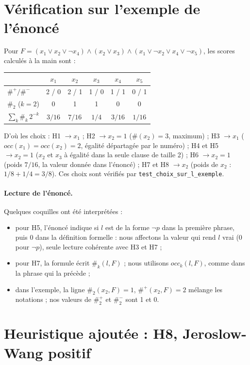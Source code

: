 \documentclass[11pt,a4paper]{article}
\begin{document}
\section{Vérification sur l'exemple de l'énoncé}

Pour $F = (x_1 \lor x_2 \lor \lnot x_4) \land (x_2 \lor x_3) \land
(x_1 \lor \lnot x_2 \lor x_4 \lor \lnot x_5)$, les scores calculés à la main
sont :
\begin{center}
\begin{tabular}{lccccc}
  \toprule
  & $x_1$ & $x_2$ & $x_3$ & $x_4$ & $x_5$ \\
  \midrule
  $\#^+ / \#^-$ & 2 / 0 & 2 / 1 & 1 / 0 & 1 / 1 & 0 / 1 \\
  $\#_2$ ($k = 2$) & 0 & 1 & 1 & 0 & 0 \\
  $\sum_k \#_k\,2^{-k}$ & $3/16$ & $7/16$ & $1/4$ & $3/16$ & $1/16$ \\
  \bottomrule
\end{tabular}
\end{center}
D'où les choix : H1 $\to x_1$ ; H2 $\to x_2 = 1$ ($\#(x_2) = 3$, maximum) ;
H3 $\to x_1$ ($occ(x_1) = occ(x_2) = 2$, égalité départagée par le numéro) ;
H4 et H5 $\to x_2 = 1$ ($x_2$ et $x_3$ à égalité dans la seule clause de
taille 2) ; H6 $\to x_2 = 1$ (poids $7/16$, la valeur donnée dans l'énoncé) ;
H7 et H8 $\to x_2$ (poids de $x_2$ : $1/8 + 1/4 = 3/8$). Ces choix sont
vérifiés par \texttt{test\_choix\_sur\_l\_exemple}.

\paragraph{Lecture de l'énoncé.} Quelques coquilles ont été interprétées :
\begin{itemize}
  \item pour H5, l'énoncé indique  si $l$ est de la forme $\lnot p$ \fg{}
    dans la première phrase, puis 0 dans la définition formelle : nous
    affectons la valeur qui rend $l$ vrai (0 pour $\lnot p$), seule lecture
    cohérente avec H3 et H7 ;
  \item pour H7, la formule écrit $\#_k(l, F)$ ; nous utilisons
    $occ_k(l, F)$, comme dans la phrase qui la précède ;
  \item dans l'exemple, la ligne \og $\#_2(x_2, F) = 1$, $\#^+(x_2, F) = 2$
    \fg{} mélange les notations ; nos valeurs de $\#^+_2$ et $\#^-_2$ sont
    1 et 0.
\end{itemize}

\section{Heuristique ajoutée : H8, Jeroslow-Wang positif}
\label{sec:h8}
\end{document}

